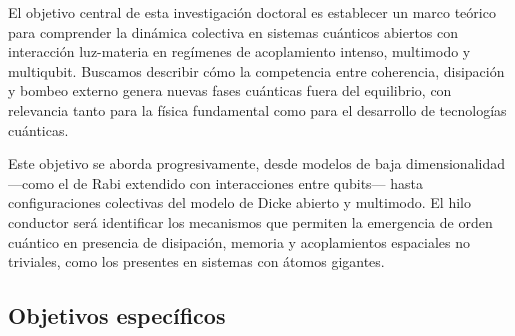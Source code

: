 \documentclass[onecolumn,notitlepage,letterpaper,aps,pra,12pt]{article}
\numberwithin{equation}{section}
\begin{document}
El objetivo central de esta investigación doctoral es establecer un marco teórico para comprender la dinámica colectiva en sistemas cuánticos abiertos con interacción luz-materia en regímenes de acoplamiento intenso, multimodo y multiqubit. Buscamos describir cómo la competencia entre coherencia, disipación y bombeo externo genera nuevas fases cuánticas fuera del equilibrio, con relevancia tanto para la física fundamental como para el desarrollo de tecnologías cuánticas.

Este objetivo se aborda progresivamente, desde modelos de baja dimensionalidad —como el de Rabi extendido con interacciones entre qubits— hasta configuraciones colectivas del modelo de Dicke abierto y multimodo. El hilo conductor será identificar los mecanismos que permiten la emergencia de orden cuántico en presencia de disipación, memoria y acoplamientos espaciales no triviales, como los presentes en sistemas con átomos gigantes.

\subsection{Objetivos específicos}
\end{document}

